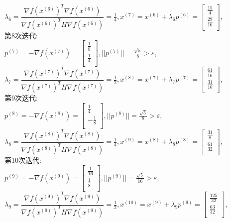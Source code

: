 \begin{solution}
    $\lambda_6=\dfrac{\nabla f(x^{(6)})^T\nabla f(x^{(6)})}{\nabla f(x^{(6)})^TH\nabla f(x^{(6)})}=\frac{1}{4},x^{(7)}=x^{(6)}+\lambda_6p^{(6)}=\begin{bmatrix} \frac{15}{4}\\\frac{29}{16}\\\end{bmatrix}$,\\
    第8次迭代:\\
    $p^{(7)}=-\nabla f(x^{(7)})=\begin{bmatrix} \frac{1}{8}\\\frac{1}{4}\\\end{bmatrix},||p^{(7)}||=\frac{\sqrt{5}}{8}>\varepsilon$,\\
    $\lambda_7=\dfrac{\nabla f(x^{(7)})^T\nabla f(x^{(7)})}{\nabla f(x^{(7)})^TH\nabla f(x^{(7)})}=\frac{1}{2},x^{(8)}=x^{(7)}+\lambda_7p^{(7)}=\begin{bmatrix} \frac{61}{16}\\\frac{31}{16}\\\end{bmatrix}$,\\
    第9次迭代:\\
    $p^{(8)}=-\nabla f(x^{(8)})=\begin{bmatrix} \frac{1}{4}\\-\frac{1}{8}\\\end{bmatrix},||p^{(8)}||=\frac{\sqrt{5}}{8}>\varepsilon$,\\
    $\lambda_8=\dfrac{\nabla f(x^{(8)})^T\nabla f(x^{(8)})}{\nabla f(x^{(8)})^TH\nabla f(x^{(8)})}=\frac{1}{4},x^{(9)}=x^{(8)}+\lambda_8p^{(8)}=\begin{bmatrix} \frac{31}{8}\\\frac{61}{32}\\\end{bmatrix}$,\\
    第10次迭代:\\
    $p^{(9)}=-\nabla f(x^{(9)})=\begin{bmatrix} \frac{1}{16}\\\frac{1}{8}\\\end{bmatrix},||p^{(9)}||=\frac{\sqrt{5}}{16}>\varepsilon$,\\
    $\lambda_9=\dfrac{\nabla f(x^{(9)})^T\nabla f(x^{(9)})}{\nabla f(x^{(9)})^TH\nabla f(x^{(9)})}=\frac{1}{2},x^{(10)}=x^{(9)}+\lambda_9p^{(9)}=\begin{bmatrix} \frac{125}{32}\\\frac{63}{32}\\\end{bmatrix}$,\\

\end{solution}
